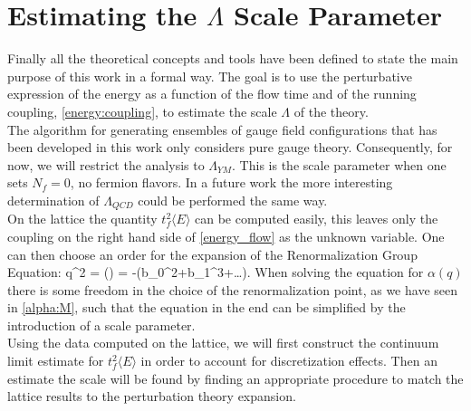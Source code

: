 \section{Estimating the $\Lambda$ Scale Parameter}
Finally all the theoretical concepts and tools have been defined to state the main purpose of this work in a formal way. The goal is to use the perturbative expression of the energy as a function of the flow time and of the running coupling, \cref{energy:coupling}, to estimate the scale $\Lambda$ of the theory. \\
The algorithm for generating ensembles of gauge field configurations that has been developed in this work only considers pure gauge theory. Consequently, for now, we will restrict the analysis to $\Lambda_{YM}$. This is the scale parameter when one sets $N_f = 0$, no fermion flavors. In a future work the more interesting determination of $\Lambda_{QCD}$ could be performed the same way. \\
On the lattice the quantity $t_f^2\langle E \rangle$ can be computed easily, this leaves only the coupling on the right hand side of \cref{energy_flow} as the unknown variable. One can then choose an order for the expansion of the Renormalization Group Equation:
\beq
q^2  = \beta(\alpha) = -(b_0\alpha^2+b_1\alpha^3+\dots).
\eeq
When solving the equation for $\alpha(q)$ there is some freedom in the choice of the renormalization point, as we have seen in \cref{alpha:M}, such that the equation in the end can be simplified by the introduction of a scale parameter.\\
Using the data computed on the lattice, we will first construct the continuum limit estimate for $t_f^2\langle E \rangle$ in order to account for discretization effects. Then an estimate the scale will be found by finding an appropriate procedure to match the lattice results to the perturbation theory expansion. 

